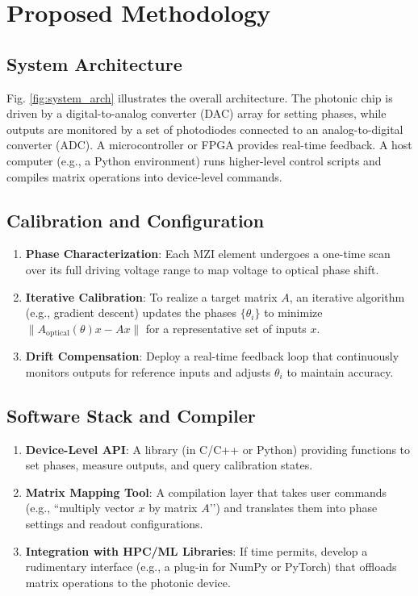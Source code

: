 \documentclass[conference]{IEEEtran}
\begin{document}
\section{Proposed Methodology}

\subsection{System Architecture}
Fig. \ref{fig:system_arch} illustrates the overall architecture. The photonic chip is driven by a digital-to-analog converter (DAC) array for setting phases, while outputs are monitored by a set of photodiodes connected to an analog-to-digital converter (ADC). A microcontroller or FPGA provides real-time feedback. A host computer (e.g., a Python environment) runs higher-level control scripts and compiles matrix operations into device-level commands.


\subsection{Calibration and Configuration}
\begin{enumerate}
    \item \textbf{Phase Characterization}: Each MZI element undergoes a one-time scan over its full driving voltage range to map voltage to optical phase shift.
    \item \textbf{Iterative Calibration}: To realize a target matrix $A$, an iterative algorithm (e.g., gradient descent) updates the phases $\{\theta_i\}$ to minimize $\| A_{\text{optical}}(\theta) x - A x \|$ for a representative set of inputs $x$.
    \item \textbf{Drift Compensation}: Deploy a real-time feedback loop that continuously monitors outputs for reference inputs and adjusts $\theta_i$ to maintain accuracy.
\end{enumerate}

\subsection{Software Stack and Compiler}
\begin{enumerate}
    \item \textbf{Device-Level API}: A library (in C/C++ or Python) providing functions to set phases, measure outputs, and query calibration states.
    \item \textbf{Matrix Mapping Tool}: A compilation layer that takes user commands (e.g., ``multiply vector $x$ by matrix $A$’’) and translates them into phase settings and readout configurations.
    \item \textbf{Integration with HPC/ML Libraries}: If time permits, develop a rudimentary interface (e.g., a plug-in for NumPy or PyTorch) that offloads matrix operations to the photonic device.
\end{enumerate}
\end{document}
